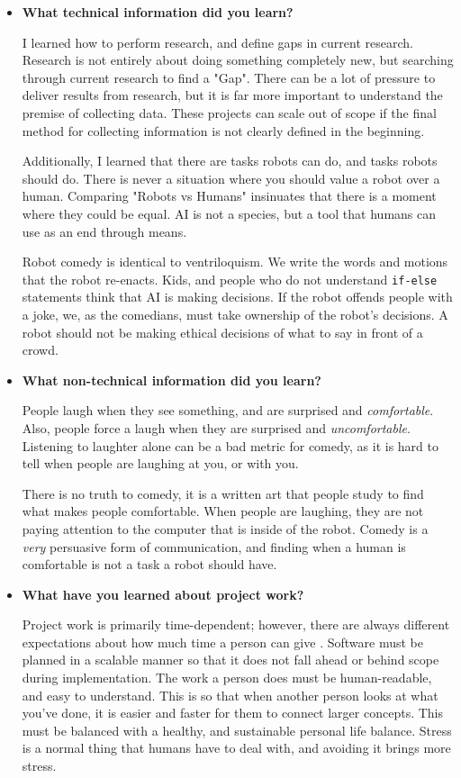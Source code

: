 \documentclass[onecolumn, draftclsnofoot,10pt, compsoc]{IEEEtran}
\begin{document}
\begin{itemize}
\item{\textbf{What technical information did you learn?}}

    I learned how to perform research, and define gaps in current research. 
    Research is not entirely about doing something completely new, but searching through current research to find a "Gap".
    There can be a lot of pressure to deliver results from research, but it is far more important to understand the premise of collecting data.
    These projects can scale out of scope if the final method for collecting information is not clearly defined in the beginning. 

    Additionally, I learned that there are tasks robots can do, and tasks robots should do.
    There is never a situation where you should value a robot over a human.
    Comparing "Robots vs Humans" insinuates that there is a moment where they could be equal.
    AI is not a species, but a tool that humans can use as an end through means.  

    Robot comedy is identical to ventriloquism. 
    We write the words and motions that the robot re-enacts.
    Kids, and people who do not understand \texttt{if-else} statements think that AI is making decisions.
    If the robot offends people with a joke, we, as the comedians, must take ownership of the robot's decisions. 
    A robot should not be making ethical decisions of what to say in front of a crowd. 

    
\item{\textbf{What non-technical information did you learn?}}

   
    People laugh when they see something, and are surprised and \textit{comfortable}.
    Also, people force a laugh when they are surprised and \textit{uncomfortable}.
    Listening to laughter alone can be a bad metric for comedy, as it is hard to tell when people are laughing at you, or with you.

    There is no truth to comedy, it is a written art that people study to find what makes people comfortable.
    When people are laughing, they are not paying attention to the computer that is inside of the robot.
    Comedy is a \textit{very} persuasive form of communication, and finding when a human is comfortable is not a task a robot should have.
  

\item{\textbf{What have you learned about project work?}}

    Project work is primarily time-dependent; however, there are always different expectations about how much time a person can give \cite{theMythicalManMonth}.
    Software must be planned in a scalable manner so that it does not fall ahead or behind scope during implementation.
    The work a person does must be human-readable, and easy to understand. 
    This is so that when another person looks at what you've done, it is easier and faster for them to connect larger concepts.
    This must be balanced with a healthy, and sustainable personal life balance.
    Stress is a normal thing that humans have to deal with, and avoiding it brings more stress.



\end{itemize}
\end{document}
